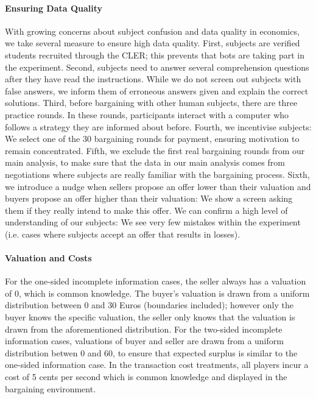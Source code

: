     

\paragraph{Ensuring Data Quality}
With growing concerns about subject confusion and data quality in economics, we take several measure to ensure high data quality. First, subjects are verified students recruited through the CLER; this prevents that bots are taking part in the experiment. Second, subjects need to answer several comprehension questions after they have read the instructions. While we do not screen out subjects with false answers, we inform them of erroneous answers given and explain the correct solutions. Third, before bargaining with other human subjects, there are three practice rounds. In these rounds, participants interact with a computer who follows a strategy they are informed about before. Fourth, we incentivise subjects: We select one of the 30 bargaining rounds for payment, ensuring motivation to remain concentrated. Fifth, we exclude the first real bargaining rounds from our main analysis, to make sure that the data in our main analysis comes from negotiations where subjects are really familiar with the bargaining process. Sixth, we introduce a nudge when sellers propose an offer lower than their valuation and buyers propose an offer higher than their valuation: We show a screen asking them if they really intend to make this offer. We can confirm a high level of understanding of our subjects: We see very few mistakes within the experiment (i.e. cases where subjects accept an offer that results in losses). 


\paragraph{Valuation and Costs}
For the one-sided incomplete information cases, the seller always has a valuation of 0, which is common knowledge. The buyer's valuation is drawn from a uniform distribution between 0 and 30 Euros (boundaries included); however only the buyer knows the specific valuation, the seller only knows that the valuation is drawn from the aforementioned distribution. 
For the two-sided incomplete information cases, valuations of buyer and seller are drawn from a uniform distribution betwen 0 and 60, to ensure that expected surplus is similar to the one-sided information case.
In the transaction cost treatments, all players incur a cost of 5 cents per second which is common knowledge and displayed in the bargaining environment. 

